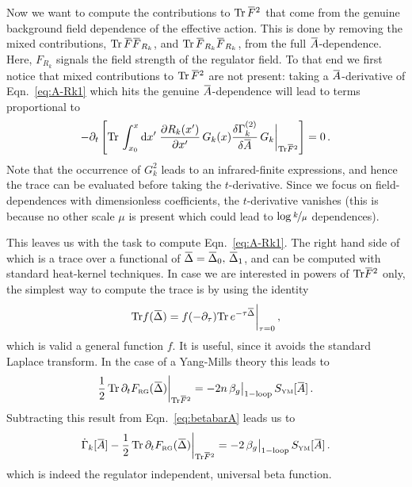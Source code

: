 \documentclass[11pt]{book}
\newcommand{\overbar}[1]{\mkern 1.5mu\overline{\mkern-1.5mu#1\mkern-1.5mu}\mkern 1.5mu}
\newcommand{\Tr}{\mathrm{Tr}}
\newcommand\FRG{ F_{\scriptscriptstyle{\mathrm{RG}}} }
\numberwithin{equation}{chapter}
\begin{document}
\begin{appendices}
Now we want to compute the contributions to $\Tr \, \overbar F^2$ that
come from the genuine background field dependence of the effective
action. This is done by removing the mixed contributions,
$\Tr\, \overbar F \overbar F_{R_k}$,
and
$\Tr \,\overbar F_{R_k} \overbar F_{R_k}$,
from the full $\overbar A$-dependence.
Here, $F_{R_k}$ signals the field strength of the regulator field.
To that end we first notice that mixed contributions to
$\Tr\, \overbar F^2$ are not present:
taking a $\overbar A$-derivative of Eqn.~\eqref{eq:A-Rk1} which hits the
genuine $\overbar A$-dependence will lead to terms proportional to
\begin{align}
	- \partial_t
	\left[
    \Tr \, \int_{x_0}^x \mathrm dx' \;
    \frac{\partial R_k(x')}{\partial x'} \, G_k(x)
    \frac{\delta \Gamma_k^{(2)}}{\delta\overbar A} \, G_k
		\bigg|_{\Tr \overbar F^2}
	\right]
  = 0 \,.
	\label{eq:mixed}
\end{align}
Note that the occurrence of $G_k^2$ leads to an infrared-finite expressions,
and hence the trace can be evaluated before taking the $t$-derivative.
Since we focus on field-dependences with dimensionless coefficients,
the $t$-derivative vanishes
(this is because no other scale $\mu$ is present which
could lead to $\log \nicefrac{k}{\mu}$ dependences).

This leaves us with the task to compute Eqn.~\eqref{eq:A-Rk1}.
The right hand side of which is a trace over a functional of
$\overbar \Delta = \overbar\Delta_0, \,\overbar\Delta_1$,
and can be computed with standard heat-kernel techniques.
In case we are interested in powers of $\Tr \overbar F^2$ only,
the simplest way to compute the trace is by using the identity
\begin{align}
	\label{eq:tau_expansion}
	\Tr f(\overbar \Delta) =
	f(-\partial_\tau ) \Tr\, e^{-\tau \overbar \Delta}\bigg|_{\tau=0} \,,
\end{align}
which is valid a general function $f$.
It is useful, since it avoids the standard Laplace transform.
In the case of a Yang-Mills theory this leads to
\begin{align}
  \frac{1}{2} \, \Tr \,
  \partial_t \FRG(\overbar \Delta) \bigg|_{\Tr \overbar F^2}
  = - 2 n \, \beta_g \big|_{\mathrm{1-loop}} \, S_{\mathrm{\scriptscriptstyle YM}}[\overbar A] \,.
	\label{eq:betabarARk}
\end{align}
Subtracting this result from Eqn.~\eqref{eq:betabarA} leads us to
\begin{align}
  \label{eq:betabarAfinal}
  \dot \Gamma_k[ \overbar A]
  - \frac{1}{2} \, \Tr\,
  \partial_t \FRG(\overbar \Delta) \bigg|_{\Tr \overbar F^2}
  = -2 \, \beta_g \big|_{\mathrm{1-loop}} \, S_{\mathrm{\scriptscriptstyle YM}}[\overbar A] \,.
\end{align}
which is indeed the regulator independent, universal beta function.


\end{appendices}
\end{document}
